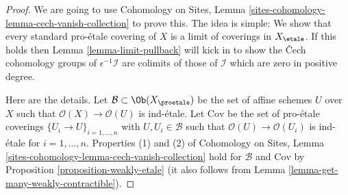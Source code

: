\begin{proof}
We are going to use
Cohomology on Sites, Lemma \ref{sites-cohomology-lemma-cech-vanish-collection}
to prove this. The idea is simple: We show that every standard pro-\'etale
covering of $X$ is a limit of coverings in $X_\etale$.
If this holds then Lemma \ref{lemma-limit-pullback} will kick in
to show the {\v C}ech cohomology groups of $\epsilon^{-1}\mathcal{I}$
are colimits of those of $\mathcal{I}$ which are zero in positive degree.

\medskip\noindent
Here are the details.
Let $\mathcal{B} \subset \Ob(X_\proetale)$ be the set of affine
schemes $U$ over $X$ such that $\mathcal{O}(X) \to \mathcal{O}(U)$ is
ind-\'etale. Let $\text{Cov}$ be the set of
pro-\'etale coverings $\{U_i \to U\}_{i = 1, \ldots, n}$
with $U, U_i \in \mathcal{B}$ such that $\mathcal{O}(U) \to \mathcal{O}(U_i)$
is ind-\'etale for $i = 1, \ldots, n$. Properties (1) and (2) of
Cohomology on Sites, Lemma \ref{sites-cohomology-lemma-cech-vanish-collection}
hold for $\mathcal{B}$ and $\text{Cov}$ by 
Proposition \ref{proposition-weakly-etale}
(it also follows from Lemma \ref{lemma-get-many-weakly-contractible}).


\end{proof}
